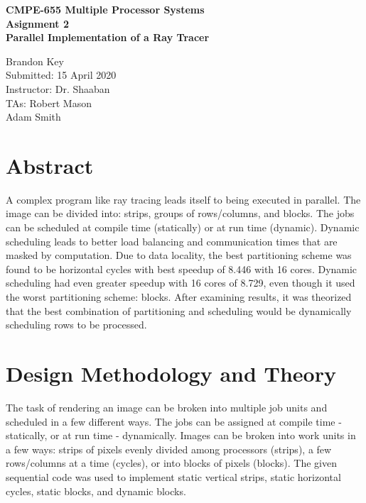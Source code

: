 \documentclass[11pt]{article}
\begin{document}
%
%

\vspace*{6 cm}

\begin{center}
\bf{CMPE-655 Multiple Processor Systems\\
    Asignment 2\\
\vspace{0.25 cm}
Parallel Implementation of a Ray Tracer
}
\end{center}

\vspace{6 cm}

\begin{flushright}
Brandon Key\\
Submitted: 15 April 2020\\
\vspace{0.5 cm}
Instructor: Dr. Shaaban\\
TAs: Robert Mason \\
Adam Smith\\
\vspace{0.5 cm}
\end{flushright}



\newpage

\section{Abstract}
	
	A complex program like ray tracing leads itself to being executed in parallel. The image can be divided into: strips, groups of rows/columns, and blocks. The jobs can be scheduled at compile time (statically) or at run time (dynamic). Dynamic scheduling leads to better load balancing and communication times that are masked by computation. Due to data locality, the best partitioning scheme was found to be horizontal cycles with best speedup of 8.446 with 16 cores. Dynamic scheduling had even greater speedup with 16 cores of 8.729, even though it used the worst partitioning scheme: blocks. After examining results, it was theorized that the best combination of partitioning and scheduling would be dynamically scheduling rows to be processed.
	

\section{Design Methodology and Theory}

	The task of rendering an image can be broken into multiple job units and scheduled in a few different ways. The jobs can be assigned at compile time - statically, or at run time - dynamically. Images can be broken into work units in a few ways: strips of pixels evenly divided among processors (strips), a few rows/columns at a time (cycles), or into blocks of pixels (blocks). The given sequential code was used to implement static vertical strips, static horizontal cycles, static blocks, and dynamic blocks.
	
\end{document}
